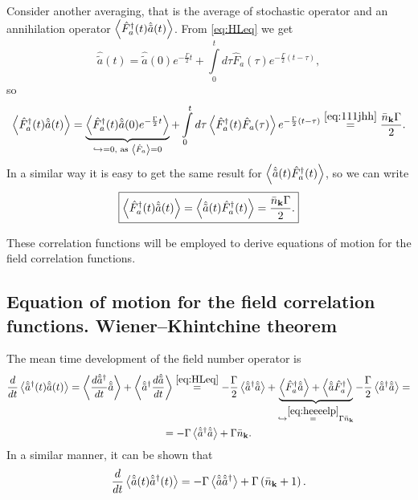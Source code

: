 Consider another averaging, that is the average of stochastic operator and an annihilation operator $\left\langle {\hat{F}_a^{\dagger}(t) \hat{\tilde{a}}(t)} \right\rangle$.
From \eqref{eq:HLeq} we get
\begin{equation}
	\hat{\tilde{a}}(t) = \hat{\tilde{a}}(0) e^{- \frac{\Gamma}{2}t} + \int \limits_0^t  d \tau \hat{F}_a(\tau)e^{- \frac{\Gamma}{2}(t - \tau)},
\end{equation}
so
\begin{equation}
	\left\langle {\hat{F}_a^{\dagger}(t) \hat{\tilde{a}}(t)} \right\rangle = \underbrace{\left\langle {\hat{F}_a^{\dagger}(t) \hat{\tilde{a}}(0)e^{- \frac{\Gamma}{2}t}} \right\rangle}_{\hookrightarrow=0, \text{ as } \left\langle {\hat{F}_a} \right\rangle=0} + \int \limits_0^t d\tau \left\langle {\hat{F}_a^{\dagger}(t) \hat{F}_a(\tau)} \right\rangle e^{- \frac{\Gamma}{2}(t - \tau)} \overset{\eqref{eq:111jhh}}{=} \frac{\bar{n}_{\mathbf{k}}\Gamma}{2}.
\end{equation}
In a similar way it is easy to get the same result for $\left\langle {\hat{\tilde{a}}(t) \hat{F}_a^{\dagger}(t) } \right\rangle$, so we can write
\begin{equation}
	\boxed{	\left\langle {\hat{F}_a^{\dagger}(t) \hat{\tilde{a}}(t)} \right\rangle = \left\langle {\hat{\tilde{a}}(t) \hat{F}_a^{\dagger}(t) } \right\rangle =  \frac{\bar{n}_{\mathbf{k}}\Gamma}{2}.}
	\label{eq:heeeelp}
\end{equation}

These correlation functions will be employed to derive equations of motion for the field correlation functions.

\subsection{Equation of motion for the field correlation functions. Wiener--Khintchine theorem}

The mean time development of the field number operator is
\begin{multline}
	\frac{d}{dt} \left\langle {\hat{\tilde{a}}^{\dagger}(t) \hat{\tilde{a}}(t)} \right\rangle  = \left\langle { \frac{d\hat{\tilde{a}}^{\dagger}}{dt} \hat{\tilde{a}}} \right\rangle + \left\langle {\hat{\tilde{a}}^{\dagger} \frac{d\hat{\tilde{a}}}{dt}} \right\rangle \overset{\eqref{eq:HLeq}}{=} - \frac{\Gamma}{2} \left\langle {\hat{\tilde{a}}^{\dagger} \hat{\tilde{a}}} \right\rangle + \underbrace{\left\langle {\hat{F}_a^{\dagger} \hat{\tilde{a}}} \right\rangle + \left\langle {\hat{\tilde{a}} \hat{F}_a^{\dagger}} \right\rangle}_{\hookrightarrow \overset{\eqref{eq:heeeelp}}{=} \Gamma \bar{n}_{\mathbf{k}}}  - \frac{\Gamma}{2} \left\langle {\hat{\tilde{a}}^{\dagger} \hat{\tilde{a}}} \right\rangle = \\ = - \Gamma \left\langle {\hat{\tilde{a}}^{\dagger} \hat{\tilde{a}}} \right\rangle + \Gamma \bar{n}_{\mathbf{k}}.
\end{multline}
In a similar manner, it can be shown that
\begin{equation}
	\frac{d}{dt} \left\langle {\hat{\tilde{a}}(t) \hat{\tilde{a}}^{\dagger}(t)} \right\rangle = - \Gamma \left\langle {\hat{\tilde{a}} \hat{\tilde{a}}^{\dagger}} \right\rangle + \Gamma \left(\bar{n}_{\mathbf{k}}+1\right).
\end{equation}

